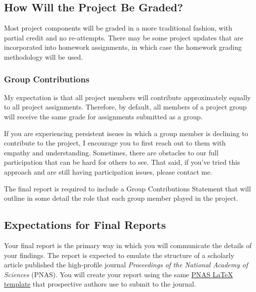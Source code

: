 \documentclass{hw}
\begin{document}
\subsection*{How Will the Project Be Graded?}

Most project components will be graded in a more traditional fashion, with partial credit and no re-attempts. 
There may be some project updates that are incorporated into homework assignments, in which case the homework grading methodology will be used. 

\subsubsection*{Group Contributions}

My expectation is that all project members will contribute approximately equally to all project assignments. 
Therefore, by default, all members of a project group will receive the same grade for assignments submitted as a group. 

If you are experiencing persistent issues in which a group member is declining to contribute to the project, I encourage you to first reach out to them with empathy and understanding. 
Sometimes, there are obstacles to our full participation that can be hard for others to see. 
That said, if you've tried this approach and are still having participation issues, please contact me. 

The final report is required to include a Group Contributions Statement that will outline in some detail the role that each group member played in the project. 

\pagebreak

\subsection*{Expectations for Final Reports}

Your final report is the primary way in which you will communicate the details of your findings. 
The report is expected to emulate the structure of a scholarly article published the high-profile journal \emph{Proceedings of the National Academy of Sciences} (PNAS). 
You will create your report using the same \href{https://www.overleaf.com/latex/templates/template-for-preparing-your-research-report-submission-to-pnas-using-overleaf/fzcbzjvpvnxn}{PNAS \LaTeX{} template} that prospective authors use to submit to the journal. 
\end{document}
